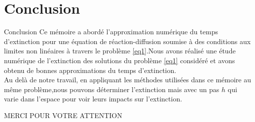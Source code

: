 \documentclass[10pt]{beamer}
\begin{document}

      
     \section{Conclusion}
     \begin{frame}{Conclusion}
      Ce mémoire a abordé l'approximation numérique du temps d'extinction pour une équation de réaction-diffusion soumise à des conditions aux limites non linéaires  à travers le problème \eqref{eq1}.Nous avons réalisé une étude numérique de l'extinction des solutions du problème \eqref{eq1} considéré et avons obtenu de bonnes approximations du temps d'extinction.\\
 Au delà de notre travail, en appliquant les méthodes utilisées dans ce mémoire au même problème,nous pouvons déterminer l'extinction mais avec un pas $h$ qui varie dans l’espace pour voir leurs impacts sur l’extinction.
 
        \end{frame}
       \begin{frame}
        \begin{block}
        
        \centering
        \Huge
        MERCI POUR VOTRE ATTENTION
        
        \end{block}
        \end{frame}
\end{document}
